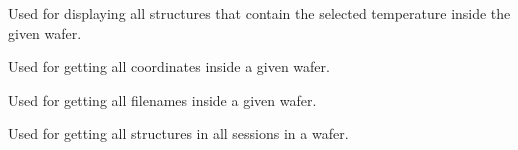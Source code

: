 \documentclass[letterpaper,10pt,english]{sphinxmanual}
\begin{document}

\begin{fulllineitems}
\label{\detokenize{app:app.filter_by_Temps}}
\pysigstartsignatures
{}
\pysigstopsignatures
\sphinxAtStartPar
Used for displaying all structures that contain the selected temperature inside the given wafer.

\end{fulllineitems}


\begin{fulllineitems}
\label{\detokenize{app:app.get_all_coords}}
\pysigstartsignatures
{}
\pysigstopsignatures
\sphinxAtStartPar
Used for getting all coordinates inside a given wafer.

\end{fulllineitems}


\begin{fulllineitems}
\label{\detokenize{app:app.get_all_filenames}}
\pysigstartsignatures
{}
\pysigstopsignatures
\sphinxAtStartPar
Used for getting all filenames inside a given wafer.

\end{fulllineitems}


\begin{fulllineitems}
\label{\detokenize{app:app.get_all_structures}}
\pysigstartsignatures
{}
\pysigstopsignatures
\sphinxAtStartPar
Used for getting all structures in all sessions in a wafer.

\end{fulllineitems}
\end{document}
